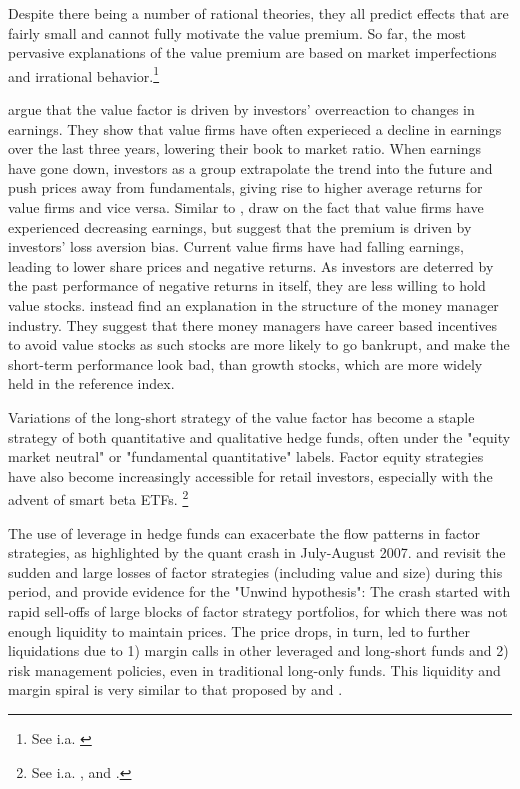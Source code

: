 Despite there being a number of rational theories, they all predict effects that are fairly small and cannot fully motivate the value premium. So far, the most pervasive explanations of the value premium are based on market imperfections and irrational behavior.\footnote{See i.a. \textcite{Ilmanen2011}}

\textcite{LakonishokShleiferVishny1994} argue that the value factor is driven by investors' overreaction to changes in earnings. They show that value firms have often experieced a decline in earnings over the last three years, lowering their book to market ratio. When earnings have gone down, investors as a group extrapolate the trend into the future and push prices away from fundamentals, giving rise to higher average returns for value firms and vice versa. Similar to \textcite{LakonishokShleiferVishny1994}, \textcite{BarberisHuang2001} draw on the fact that value firms have experienced decreasing earnings, but suggest that the premium is driven by investors' loss aversion bias. Current value firms have had falling earnings, leading to lower share prices and negative returns. As investors are deterred by the past performance of negative returns in itself, they are less willing to hold value stocks. \textcite{LakonishokShleiferVishny1992} instead find an explanation in the structure of the money manager industry. They suggest that there money managers have career based incentives to avoid value stocks as such stocks are more likely to go bankrupt, and make the short-term performance look bad, than growth stocks, which are more widely held in the reference index.

Variations of the long-short strategy of the value factor has become a staple strategy of both quantitative and qualitative hedge funds, often under the "equity market neutral" or "fundamental quantitative" labels. Factor equity strategies have also become increasingly accessible for retail investors, especially with the advent of smart beta ETFs. \footnote{See i.a. \textcite{Pedersen2015}, \textcite{AQREMN} and \textcite{McKEMN}.} 

The use of leverage in hedge funds can exacerbate the flow patterns in factor strategies, as highlighted by the quant crash in July-August 2007. \textcite{KhandaniLo2011} and \textcite{KhandaniLo2007} revisit the sudden and large losses of factor strategies (including value and size) during this period, and provide evidence for the "Unwind hypothesis": The crash started with rapid sell-offs of large blocks of factor strategy portfolios, for which there was not enough liquidity to maintain prices. The price drops, in turn, led to further liquidations due to 1) margin calls in other leveraged and long-short funds and 2) risk management policies, even in traditional long-only funds. This liquidity and margin spiral is very similar to that proposed by \textcite{Brunnermeier2009} and \textcite{BrunnermeierPedersen2009}.

